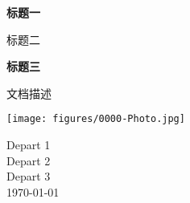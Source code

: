 \begin{titlepage}
    \begin{center}
        \vspace*{1cm}

        \Huge
        \textbf{标题一}

        \vspace{0.5cm}
        \LARGE
        标题二

        \vspace{1.5cm}

        \textbf{标题三}


        \vfill

        文档描述

        \vspace{0.8cm}

        \texttt{[image: figures/0000-Photo.jpg]}

        \Large
        Depart 1\\
        Depart 2\\
        Depart 3\\
        \today

    \end{center}
\end{titlepage}
